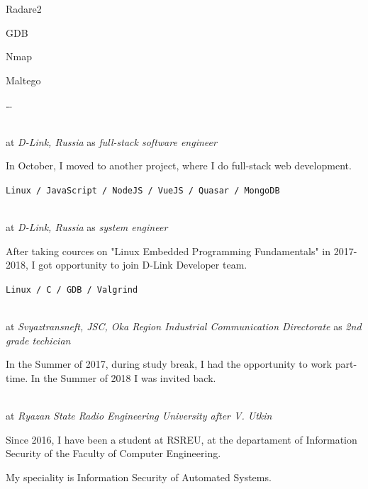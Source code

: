 \SmallSep

\begin{multicols}{3}
\begin{compactitem}[\color{Cyan}$\circ$]
    \item Radare2
    \item GDB
    \item Nmap
    \item Maltego
    \item \ldots
\end{compactitem}
\end{multicols}

\Sep


 \\
at \textit{D-Link, Russia}
as \textit{full-stack software engineer}
\SmallSep

In October, I moved to another project, where I do full-stack web development.
\SmallSep

\texttt{Linux / JavaScript / NodeJS / VueJS / Quasar / MongoDB}
\SmallSep

 \\
at \textit{D-Link, Russia}
as \textit{system engineer}
\SmallSep

After taking cources on "Linux Embedded Programming Fundamentals" in 2017-2018, I got opportunity to join D-Link Developer team.
\SmallSep

\texttt{Linux / C / GDB / Valgrind}
\SmallSep

 \\
at \textit{Svyaztransneft, JSC, Oka Region Industrial Communication Directorate}
as \textit{2nd grade techician}
\SmallSep

In the Summer of 2017, during study break, I had the opportunity to work part-time. In the Summer of 2018 I was invited back.

\clearpage
\framebreak
\framebreak

 \\
at \textit{Ryazan State Radio Engineering University after V. Utkin}
\SmallSep

Since 2016, I have been a student at RSREU, at the departament of Information Security of the Faculty of Computer Engineering.

My speciality is Information Security of Automated Systems.

